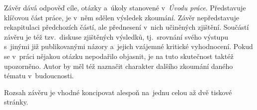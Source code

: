 Závěr dává odpověď cíle, otázky a~úkoly stanovené v~\textit{Úvodu práce}.
Představuje klíčovou část práce, je v~něm sdělen výsledek zkoumání. Závěr
nepředstavuje rekapitulaci předchozích částí, ale přednesení v~nich učiněných
zjištění. Součástí závěru je též tzv.~diskuse zjištěných výsledků, tj.~srovnání
svého výstupu s~jinými již publikovanými názory a~jejich vzájemné kritické
vyhodnocení. Pokud se v~práci nějakou otázku nepodařilo objasnit, je na tuto
skutečnost taktéž upozorněno. Autor by měl též naznačit charakter dalšího
zkoumání daného tématu v~budoucnosti.

\noindent
Rozsah závěru je vhodné koncipovat alespoň na~jednu celou až dvě tiskové
stránky.

